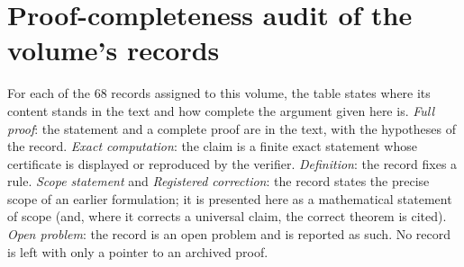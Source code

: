 \chapter{Proof-completeness audit of the volume's records}\label{app:audit}

For each of the 68 records assigned to this volume, the table states where its content stands in the text and how complete the argument given here is. \emph{Full proof}: the statement and a complete proof are in the text, with the hypotheses of the record. \emph{Exact computation}: the claim is a finite exact statement whose certificate is displayed or reproduced by the verifier. \emph{Definition}: the record fixes a rule. \emph{Scope statement} and \emph{Registered correction}: the record states the precise scope of an earlier formulation; it is presented here as a mathematical statement of scope (and, where it corrects a universal claim, the correct theorem is cited). \emph{Open problem}: the record is an open problem and is reported as such. No record is left with only a pointer to an archived proof.


